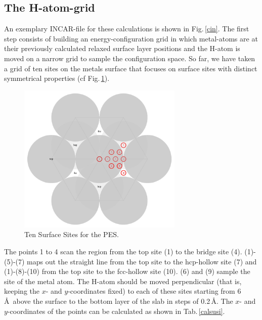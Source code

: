 \documentclass[twoside, 11pt, titlepage, captions=nooneline, a4paper, headsepline]{scrbook}%
\newcommand{\9}{\mathrm}
\newcommand{\0}{\,\mathrm}
\begin{document}
\subsection{The H-atom-grid}
An exemplary INCAR-file for these calculations is shown in Fig.\,\ref{cin}.
The first step consists of building an energy-configuration grid in which metal-atoms are at their previously calculated relaxed surface layer positions and the H-atom is moved on a narrow grid to sample the configuration space. So far, we have taken a grid of ten sites on the metals surface that focuses on surface sites with distinct symmetrical properties (cf Fig.\,\ref{surfacesites}).
\begin{figure}[t!]
\centering
\includegraphics[width=0.7\textwidth]{Figures/SurfaceSites}
\caption{Ten Surface Sites for the PES.}
\label{surfacesites}
\end{figure}
The points 1 to 4 scan the region from the top site (1) to the bridge site (4). (1)-(5)-(7) maps out the straight line from the top site to the hcp-hollow site (7) and (1)-(8)-(10) from the top site to the fcc-hollow site (10). (6) and (9) sample the site of the metal atom. The H-atom should be moved perpendicular (that is, keeping the $x$- and $y$-coordinates fixed) to each of these sites starting from 6\,\AA~above the surface to the bottom layer of the slab in steps of 0.2\,\AA. The $x$- and $y$-coordinates of the points can be calculated as shown in Tab.\,\ref{calsusi}.
\end{document}
